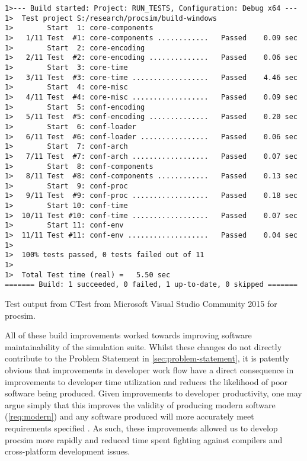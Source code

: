 \begin{listing}[hb!]
\begin{verbatim}
1>--- Build started: Project: RUN_TESTS, Configuration: Debug x64 ---
1>  Test project S:/research/procsim/build-windows
1>        Start  1: core-components
1>   1/11 Test  #1: core-components ............   Passed    0.09 sec
1>        Start  2: core-encoding
1>   2/11 Test  #2: core-encoding ..............   Passed    0.06 sec
1>        Start  3: core-time
1>   3/11 Test  #3: core-time ..................   Passed    4.46 sec
1>        Start  4: core-misc
1>   4/11 Test  #4: core-misc ..................   Passed    0.09 sec
1>        Start  5: conf-encoding
1>   5/11 Test  #5: conf-encoding ..............   Passed    0.20 sec
1>        Start  6: conf-loader
1>   6/11 Test  #6: conf-loader ................   Passed    0.06 sec
1>        Start  7: conf-arch
1>   7/11 Test  #7: conf-arch ..................   Passed    0.07 sec
1>        Start  8: conf-components
1>   8/11 Test  #8: conf-components ............   Passed    0.13 sec
1>        Start  9: conf-proc
1>   9/11 Test  #9: conf-proc ..................   Passed    0.18 sec
1>        Start 10: conf-time
1>  10/11 Test #10: conf-time ..................   Passed    0.07 sec
1>        Start 11: conf-env
1>  11/11 Test #11: conf-env ...................   Passed    0.04 sec
1>
1>  100% tests passed, 0 tests failed out of 11
1>
1>  Total Test time (real) =   5.50 sec
======= Build: 1 succeeded, 0 failed, 1 up-to-date, 0 skipped =======
\end{verbatim}
\caption{Test output from CTest \cite{CMake:CTest} from Microsoft Visual Studio Community 2015 for procsim.}
\label{lst:cross-platform:ctest-output}
\end{listing}  

All of these build improvements worked towards improving software maintainability of the simulation suite. Whilst these changes do not directly contribute to the Problem Statement in \cref{sec:problem-statement}, it is patently obvious that improvements in developer work flow have a direct consequence in improvements to developer time utilization and reduces the likelihood of poor software being produced. Given improvements to developer productivity, one may argue simply that this improves the validity of producing modern software (\cref{req:modern}) and any software produced will more accurately meet requirements specified \cite{Solis2011}. As such, these improvements allowed us to develop procsim more rapidly and reduced time spent fighting against compilers and cross-platform development issues.
